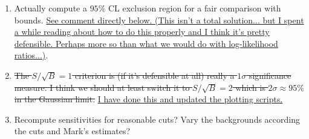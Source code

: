 \documentclass[11pt, a4paper]{article}
\newcommand{\newtext}[2]{\textcolor{#1}{\ul{#2}}}
\begin{document}
\begin{enumerate}





\item Actually compute a $95\%$ CL exclusion region for a fair comparison with
bounds. \newtext{PB}{See comment directly below. (This isn't a total
solution... but I spent a while reading about how to do this properly and I
think it's pretty defensible. Perhaps more so than what we would do with
log-likelihood ratios...)}.

\item \sout{The $S/\sqrt{B} =1$ criterion is (if it's defensible at all) really a
$1\sigma$ significance measure. I think we should at least switch it to
$S/\sqrt{B} =2$ which is $2\sigma\approx 95\%$ in the Gaussian limit.}
\newtext{PB}{I have done this and updated the plotting scripts.}

\item Recompute sensitivities for reasonable cuts? Vary the backgrounds
according the cuts and Mark's estimates?




\end{enumerate}
\end{document}
